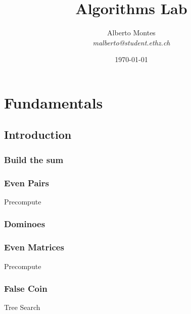 \documentclass[10pt,a4paper,twoside]{report}
\title{Algorithms Lab}
\author{
    Alberto Montes \\
    \textit{malberto@student.ethz.ch}
}
\date{\today}
\begin{document}
\maketitle

\tableofcontents
\newpage

\chapter{Fundamentals}

\section{Introduction}

\subsection*{Build the sum}
\begin{keywords}\end{keywords}



\newpage
\subsection*{Even Pairs}
\begin{keywords}Precompute\end{keywords}


\newpage
\subsection*{Dominoes}
\begin{keywords}\end{keywords}


\newpage
\subsection*{Even Matrices}
\begin{keywords}Precompute\end{keywords}


\newpage
\subsection*{False Coin}
\begin{keywords}Tree Search\end{keywords}

\end{document}
